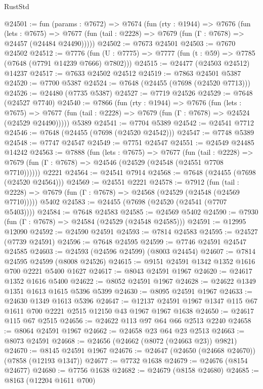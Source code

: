 \begin{lexlean}{RustStd}
\begin{coremodule}
@24501 := fun (params : @7672) =>
  @7674
    (fun (rty : @1944) =>
    @7676
      (fun (lets : @7675) =>
      @7677 (fun (tail : @2228) => @7679 (fun (Γ : @7678) => @24457 (@24484 @24490)))))
@24502 := @7673 @24501
@24503 := @7670 @24502
@24512 := @7776
    (fun (U : @7775) => @7777 (fun (t : @59) => @7785 (@7648 (@7791 @14239 @7666) @7802)))
@24515 := @24477 (@24503 @24512) @14237
@24517 := @7633 @24502 @24512
@24519 := @7863 @24501 @5387
@24520 := @7700 @5387
@24524 := @7648 (@24455 (@7698 (@24520 @7713)))
@24526 := @24480 (@7735 @5387)
@24527 := @7719 @24526
@24529 := @7648 (@24527 @7740)
@24540 := @7866
    (fun (rty : @1944) =>
    @7676
      (fun (lets : @7675) =>
      @7677 (fun (tail : @2228) => @7679 (fun (Γ : @7678) => @24524 (@24529 @24490)))))
    @5389
@24541 := @7704 @5389
@24542 := @24541 @7712
@24546 := @7648 (@24455 (@7698 (@24520 @24542)))
@24547 := @7748 @5389
@24548 := @7747 @24547
@24549 := @7751 @24547
@24551 := @24549 @24485 @14242
@24563 := @7888
    (fun (lets : @7675) =>
    @7677
      (fun (tail : @2228) =>
      @7679 (fun (Γ : @7678) => @24546 (@24529 (@24548 (@24551 @7708 @7710))))))
    @2221
@24564 := @24541 @7914
@24568 := @7648 (@24455 (@7698 (@24520 @24564)))
@24569 := @24551 @2221
@24578 := @7912
    (fun (tail : @2228) => @7679 (fun (Γ : @7678) => @24568 (@24529 (@24548 (@24569 @7710)))))
    @5402
@24583 := @24455 (@7698 (@24520 (@24541 (@7707 @5403))))
@24584 := @7648 @24583
@24585 := @24569 @5402
@24590 := @7930 (fun (Γ : @7678) => @24584 (@24529 (@24548 @24585)))
@24591 := @12995 @12090
@24592 := @24590 @24591
@24593 := @7814 @24583
@24595 := @24527 (@7739 @24591)
@24596 := @7648 @24595
@24599 := @7746 @24591 @24547 @24585
@24603 := @24593 (@24596 @24599) (@8003 @24454)
@24607 := @7814 @24595 @24599 (@8008 @24526)
@24615 := @9151 @24591 @1342 @1352 @1616 @700 @2221 @5400 @1627
@24617 := @8043 @24591 @1967
@24620 := @24617 @1352 @1616 @5400
@24622 := @8052 @24591 @1967
@24628 := @24622 @1349 @1351 @1613 @1615 @5396 @5399
@24630 := @8095 @24591 @1967
@24633 := @24630 @1349 @1613 @5396
@24647 := @12137 @24591 @1967 @1347 @115 @67 @1611 @700 @2221 @2515 @12150 @43 @1967 @1967 @1638
@24650 := @24617 @115 @67 @2515
@24656 := @24622 @113 @97 @64 @66 @2513 @2240
@24658 := @8064 @24591 @1967
@24662 := @24658 @23 @64 @23 @2513
@24663 := @8073 @24591
@24668 := @24656 (@24662 (@8072 (@24663 @23)) @9821)
@24670 := @8145 @24591 @1967
@24676 := @24647 (@24650 (@24668 @24670)) (@7858 (@12193 @1347))
@24677 := @7732 @1638
@24679 := @24676 (@8154 @24677)
@24680 := @7756 @1638
@24682 := @24679 (@8158 @24680)
@24685 := @8163 (@12204 @1611 @700)

\end{coremodule}
\end{lexlean}
